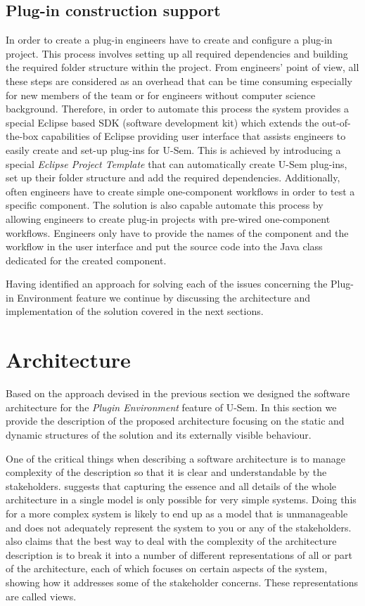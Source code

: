 \subsection{Plug-in construction support}

In order to create a plug-in engineers have to create and configure a plug-in project. This process involves setting up all required dependencies and building the required folder structure within the project. From engineers' point of view, all these steps are considered as an overhead that can be time consuming especially for new members of the team or for engineers without computer science background. Therefore, in order to automate this process the system provides a special Eclipse based SDK (software development kit) which extends the out-of-the-box capabilities of Eclipse providing user interface that assists engineers to easily create and set-up plug-ins for U-Sem. This is achieved by introducing a special \textit{Eclipse Project Template} \cite{silva2009practical} that can automatically create U-Sem plug-ins, set up their folder structure and add the required dependencies. Additionally, often engineers have to create simple one-component workflows in order to test a specific component. The solution is also capable automate this process by allowing engineers to create plug-in projects with pre-wired one-component workflows. Engineers only have to provide the names of the component and the workflow in the user interface and put the source code into the Java class dedicated for the created component. 

Having identified an approach for solving each of the issues concerning the Plug-in Environment feature we continue by discussing the architecture and implementation of the solution covered in the next sections. 

\section{Architecture}
\label{sec:architecturePlugin}

Based on the approach devised in the previous section we designed the software architecture for the \textit{Plugin Environment} feature of U-Sem. In this section we provide the description of the proposed architecture focusing on the static and dynamic structures of the solution and its externally visible behaviour.

One of the critical things when describing a software architecture is to manage complexity of the description so that it is clear and understandable by the stakeholders. \cite{rozanski2011software} suggests that capturing the essence and all details of the whole architecture in a single model is only possible for very simple systems. Doing this for a more complex system is likely to end up as a model that is unmanageable and does not adequately represent the system to you or any of the stakeholders. \cite{rozanski2011software} also claims that the best way to deal with the complexity of the architecture description is to break it into a number of different representations of all or part of the architecture, each of which focuses on certain aspects of the system, showing how it addresses some of the stakeholder concerns. These representations are called views.

